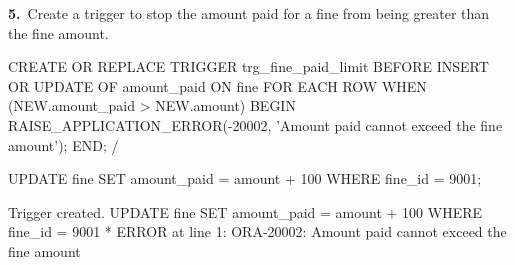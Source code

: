 \noindent\begin{minipage}{\linewidth}
\begingroup{}
{\fontsize{14}{17}\selectfont\textbf{5.}}\ Create a trigger to stop the amount paid for a fine from being greater than the fine amount.\par
\endgroup\vspace{12pt}


\begin{sqlcode}
CREATE OR REPLACE TRIGGER trg_fine_paid_limit
BEFORE INSERT OR UPDATE OF amount_paid ON fine
FOR EACH ROW
WHEN (NEW.amount_paid > NEW.amount)
BEGIN
   RAISE_APPLICATION_ERROR(-20002, 'Amount paid cannot exceed the fine amount');
END;
/

UPDATE fine SET amount_paid = amount + 100 WHERE fine_id = 9001;
\end{sqlcode}

\vspace{18pt}


\begin{sqlout}[fontsize=\small]
Trigger created.
UPDATE fine SET amount_paid = amount + 100 WHERE fine_id = 9001
       *
ERROR at line 1:
ORA-20002: Amount paid cannot exceed the fine amount
\end{sqlout}
\end{minipage}\par\vspace{24pt}

